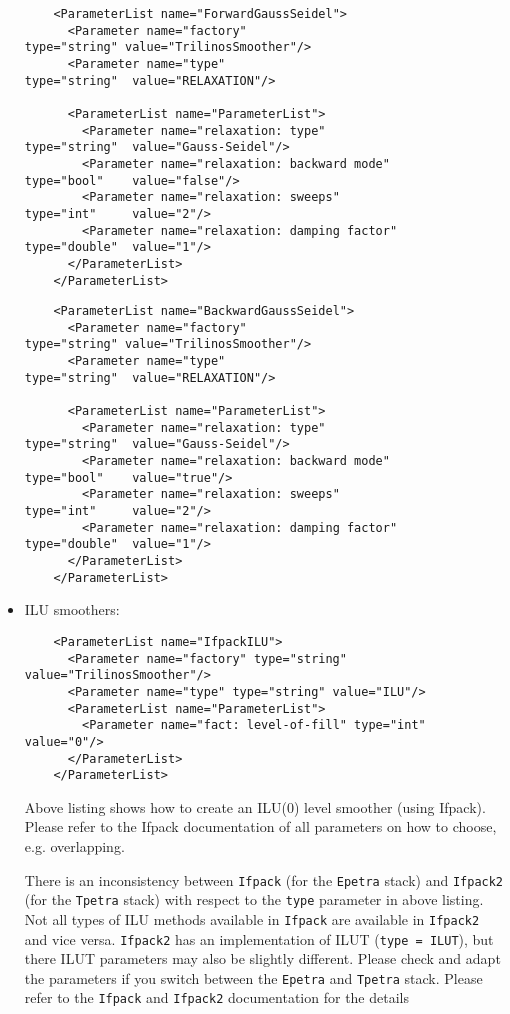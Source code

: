 \documentclass[10pt,fleqn]{book}
\begin{document}
\begin{itemize}
\begin{lstlisting}
    <ParameterList name="ForwardGaussSeidel">
      <Parameter name="factory"                        type="string" value="TrilinosSmoother"/>
      <Parameter name="type"                                type="string"  value="RELAXATION"/>

      <ParameterList name="ParameterList">
        <Parameter name="relaxation: type"                  type="string"  value="Gauss-Seidel"/>
        <Parameter name="relaxation: backward mode"         type="bool"    value="false"/>
        <Parameter name="relaxation: sweeps"                type="int"     value="2"/>
        <Parameter name="relaxation: damping factor"        type="double"  value="1"/>
      </ParameterList>
    </ParameterList>
\end{lstlisting}

\begin{lstlisting}
    <ParameterList name="BackwardGaussSeidel">
      <Parameter name="factory"                        type="string" value="TrilinosSmoother"/>
      <Parameter name="type"                                type="string"  value="RELAXATION"/>

      <ParameterList name="ParameterList">
        <Parameter name="relaxation: type"                  type="string"  value="Gauss-Seidel"/>
        <Parameter name="relaxation: backward mode"         type="bool"    value="true"/>
        <Parameter name="relaxation: sweeps"                type="int"     value="2"/>
        <Parameter name="relaxation: damping factor"        type="double"  value="1"/>
      </ParameterList>
    </ParameterList>
\end{lstlisting}
\item ILU smoothers:
\begin{lstlisting}
    <ParameterList name="IfpackILU">
      <Parameter name="factory" type="string" value="TrilinosSmoother"/>
      <Parameter name="type" type="string" value="ILU"/>
      <ParameterList name="ParameterList">
        <Parameter name="fact: level-of-fill" type="int" value="0"/>
      </ParameterList>
    </ParameterList>
\end{lstlisting}
Above listing shows how to create an ILU(0) level smoother (using Ifpack). Please refer to the Ifpack documentation of all parameters on how to choose, e.g. overlapping.

\begin{remark}
There is an inconsistency between \texttt{Ifpack} (for the \texttt{Epetra} stack) and \texttt{Ifpack2} (for the \texttt{Tpetra} stack) with respect to the \texttt{type} parameter in above listing. Not all types of ILU methods available in \texttt{Ifpack} are available in \texttt{Ifpack2} and vice versa. \texttt{Ifpack2} has an implementation of ILUT (\texttt{type = ILUT}), but there ILUT parameters may also be slightly different. Please check and adapt the parameters if you switch between the \texttt{Epetra} and \texttt{Tpetra} stack. Please refer to the \texttt{Ifpack} and \texttt{Ifpack2} documentation for the details
\end{remark}


\end{itemize}
\end{document}
